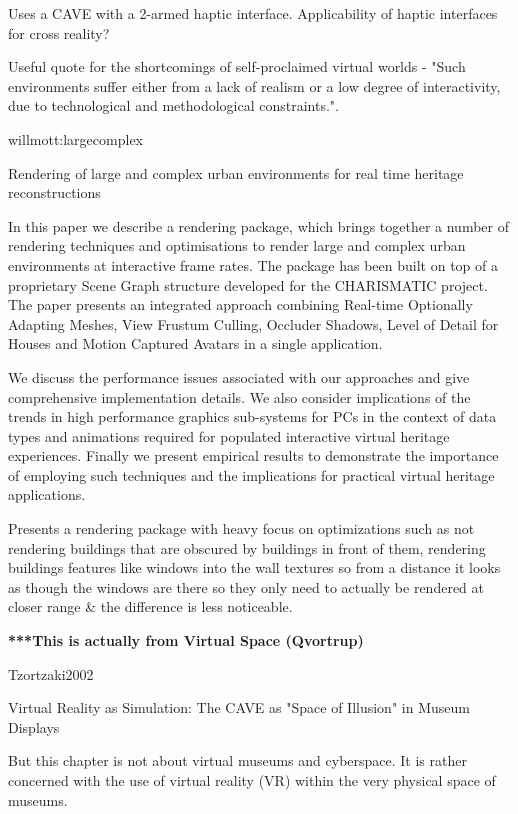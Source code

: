 Uses a CAVE with a 2-armed haptic interface. Applicability of haptic interfaces for cross
reality?
        
Useful quote for the shortcomings of self-proclaimed virtual worlds - "Such environments suffer
either from a lack of realism or a low degree of interactivity, due to technological and
methodological constraints.".


willmott:largecomplex

Rendering of large and complex urban environments for real time heritage reconstructions

In this paper we describe a rendering package, which brings
together a number of rendering techniques and optimisations to
render large and complex urban environments at interactive frame
rates. The package has been built on top of a proprietary Scene
Graph structure developed for the CHARISMATIC project. The
paper presents an integrated approach combining Real-time
Optionally Adapting Meshes, View Frustum Culling, Occluder
Shadows, Level of Detail for Houses and Motion Captured
Avatars in a single application.

We discuss the performance issues associated with our
approaches and give comprehensive implementation details. We
also consider implications of the trends in high performance
graphics sub-systems for PCs in the context of data types and
animations required for populated interactive virtual heritage
experiences. Finally we present empirical results to demonstrate
the importance of employing such techniques and the implications
for practical virtual heritage applications.


Presents a rendering package with heavy focus on optimizations such as not rendering buildings
that are obscured by buildings in front of them, rendering buildings features like windows into
the wall textures so from a distance it looks as though the windows are there so they only need to
actually be rendered at closer range \& the difference is less noticeable.


\textbf{***This is actually from Virtual Space (Qvortrup)}

Tzortzaki2002

Virtual Reality as Simulation: The CAVE as "Space of Illusion" in Museum Displays

But this chapter is not about virtual museums and cyberspace. It is rather concerned with the use of virtual reality (VR) within the very physical space of museums.

